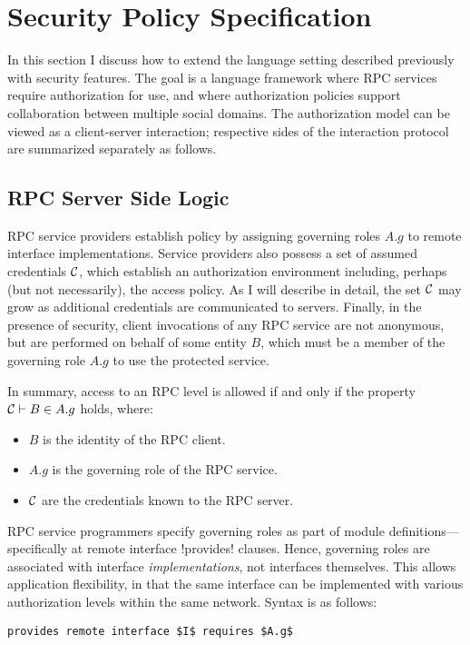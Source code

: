 \section{Security Policy Specification}
\label{section-security-extensions}

In this section I discuss how to extend the language setting described previously with security
features. The goal is a language framework where RPC services require authorization for use, and
where authorization policies support collaboration between multiple social domains. The
authorization model can be viewed as a client-server interaction; respective sides of the
interaction protocol are summarized separately as follows.

\subsection{RPC Server Side Logic}
\label{section-rpc-server-side}

RPC service providers establish policy by assigning governing roles $A.g$ to remote interface
implementations. Service providers also possess a set of assumed credentials $\mathcal{C}$, which
establish an authorization environment including, perhaps (but not necessarily), the access
policy. As I will describe in detail, the set $\mathcal{C}$ may grow as additional credentials are
communicated to servers. Finally, in the presence of security, client invocations of any RPC
service are not anonymous, but are performed on behalf of some entity $B$, which must be a
member of the governing role $A.g$ to use the protected service.

In summary, access to an RPC level is allowed if and only if the property $\mathcal{C} \vdash B \in
A.g$ holds, where:
\begin{itemize}
  \item $B$ is the identity of the RPC client.
  \item $A.g$ is the governing role of the RPC service.
  \item $\mathcal{C}$ are the credentials known to the RPC server.
\end{itemize}
RPC service programmers specify governing roles as part of module definitions---specifically at
remote interface !provides! clauses. Hence, governing roles are associated with interface
\emph{implementations}, not interfaces themselves. This allows application flexibility, in that
the same interface can be implemented with various authorization levels within the same network.
Syntax is as follows:
\begin{lstlisting}[mathescape=true]
provides remote interface $I$ requires $A.g$
\end{lstlisting}

